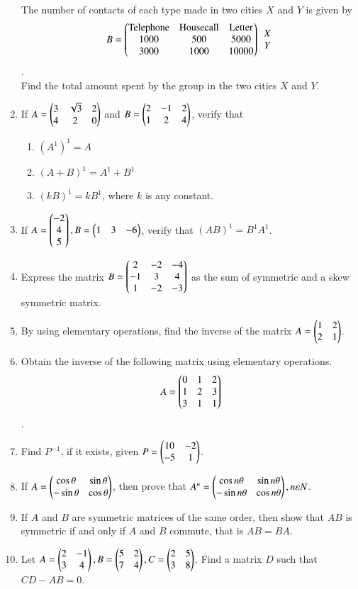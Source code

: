 \documentclass{article}
\theoremstyle{remark}
\begin{document}
\begin{enumerate}
\\ The number of contacts of each type made in two cities $X$ and $Y$ is given by 
\begin{align} B=\begin{pmatrix}\text{Telephone}&\text{Housecall}&\text{Letter} \\ 1000&500&5000\\3000&1000&10000\end{pmatrix}\begin {array}{c} X\\Y\end{array}\end{align}. 
\\ Find the total amount spent by the group in the two cities $X$ and $Y$.
\item If $A=\begin{pmatrix}3&\sqrt3&2\\4&2&0\end{pmatrix}$ and $B=\begin{pmatrix}2&-1&2\\1&2&4\end{pmatrix}$, verify that 
\begin{enumerate}
\item $(A^1)^1=A$
\item $(A+B)^1=A^1+B^1$
\item $(kB)^1=kB^1$, where $k$ is any constant.
\end{enumerate}
\item If $A=\begin{pmatrix}-2\\4\\5\end{pmatrix}, B=\begin{pmatrix}1&3&-6\end{pmatrix}$, verify that $(AB)^1=B^1A^1$.
\item Express the matrix $B=\begin{pmatrix}2&-2&-4\\-1&3&4\\1&-2&-3\end{pmatrix}$ as the sum of symmetric and a skew symmetric matrix.
\item By using elementary operations, find the inverse of the matrix $A=\begin{pmatrix}1&2\\2&1\end{pmatrix}$.
\item Obtain the inverse of the following matrix using elementary operations. 
\begin{align}A=\begin{pmatrix}0&1&2\\1&2&3\\3&1&1\end{pmatrix} \end{align}.
\item Find $P^{-1}$, if it exists, given $P=\begin{pmatrix}10&-2\\-5&1\end{pmatrix}$.
\item If $A=\begin{pmatrix}\cos \theta& \sin \theta\\ -\sin \theta&\cos\theta\end{pmatrix}$, then prove that $A^n=\begin{pmatrix}\cos n\theta&\sin n\theta\\ -\sin n\theta&\cos n\theta\end{pmatrix}, n\varepsilon N$.
\item If $A$ and $B$ are symmetric matrices of the same order, then show that $AB$ is symmetric if and only if $A$ and $B$ commute, that is $AB=BA$.
\item Let $A=\begin{pmatrix}2&-1\\3&4\end{pmatrix}, B=\begin{pmatrix}5&2\\7&4\end{pmatrix}, C=\begin{pmatrix}2&5\\3&8\end{pmatrix}$. Find a matrix $D$ such that $CD-AB=0$.
\end{enumerate}
\end{document}
